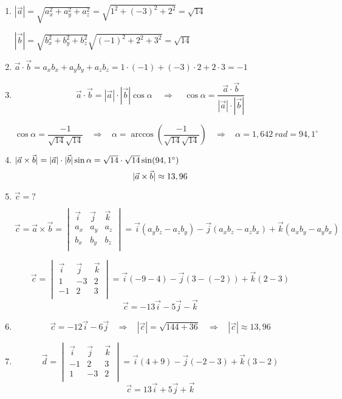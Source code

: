 


\begin{enumerate}[label=\alph*)]
 \item 
 $|\vec{a}|=\sqrt{a_x^2+a_y^2+a_z^2}=\sqrt{1^2+(-3)^2+2^2}=\sqrt{14}$
 
 $|\vec{b}|=\sqrt{b_x^2+b_y^2+b_z^2}\sqrt{(-1)^2+2^2+3^2}=\sqrt{14}$
 
 \item $\vec{a} \cdot \vec{b}=a_xb_x+a_yb_y+a_zb_z=1\cdot(-1)+(-3)\cdot2+2\cdot3=-1  $
 
 \item   $$\vec{a} \cdot \vec{b}=|\vec{a}| \cdot| \vec{b}|\cos\alpha \ \ \ \ \ \Rightarrow  \ \ \ \ \  \cos\alpha=\frac{\vec{a} \cdot \vec{b}}{|\vec{a}| \cdot| \vec{b}|}$$
 
 $$\cos\alpha=\frac{-1}{\sqrt{14}\sqrt{14}} \ \ \ \ \Rightarrow  \ \ \ \  \alpha=\arccos \left( \frac{-1}{\sqrt{14}  \sqrt{14}} \right) 
  \ \ \ \ \Rightarrow  \ \ \ \   \alpha=1,642\ rad=94,1^\circ$$
 
 
 
 \item $\arrowvert \vec{a} \times \vec{b}  \arrowvert =  |\vec{a}| \cdot| \vec{b}|\sin\alpha =\sqrt{14}\cdot\sqrt{14} \sin(94,1^\circ)   $
 $$\arrowvert \vec{a} \times \vec{b}  \arrowvert \approx 13,96$$
 
 
 \item $  \vec{c} =?$
 
 $$\vec{c}=\vec{a} \times \vec{b}=
 \begin{vmatrix}
  \vec{i} & \vec{j} & \vec{k} \\
  a_x  & a_y  & a_z  \\
  b_x  & b_y  & b_z  \\
 \end{vmatrix}
 =\vec{i}(a_yb_z-a_zb_y)-\vec{j}(a_xb_z-a_zb_x) + \vec{k}(a_xb_y-a_yb_x)
 $$
 
 $$\vec{c}=
 \begin{vmatrix}
   \vec{i} & \vec{j} & \vec{k} \\
   1 & -3 & 2 \\
   -1 & 2 & 3 \\
 \end{vmatrix}
 =\vec{i}(-9-4)-\vec{j}(3-(-2))+ \vec{k}(2-3) $$
  $$\vec{c}= -13\vec{i}-5\vec{j} -\vec{k}$$
 \item 
 $$\vec{c}= -12\vec{i}-6\vec{j}  \ \ \ \ \Rightarrow  \ \ \ \ |\vec{c}|=\sqrt{144+36} \ \ \ \ \Rightarrow  \ \ \ \ |\vec{c}|\approx13,96 $$
 \item 
 $$\vec{d}=
 \begin{vmatrix}
   \vec{i} & \vec{j} & \vec{k} \\
   -1 & 2 & 3 \\
   1 & -3 & 2 \\
 \end{vmatrix}
 =\vec{i}(4+9)-\vec{j}(-2-3)+ \vec{k}(3-2) $$
  $$\vec{c}= 13\vec{i}+5\vec{j} + \vec{k}$$

\end{enumerate}
